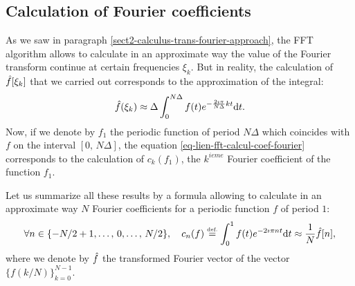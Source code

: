 \subsection{Calculation of Fourier coefficients}
\label{sect2-calcul-coef-fourier} 
 
 
 As we saw in paragraph \ref{sect2-calculus-trans-fourier-approach}, the FFT algorithm allows to calculate in an approximate way the value of the Fourier transform continue at certain frequencies $ \xi_k $. But in reality, the calculation of $ \hat{f}[\xi_k] $ that we carried out corresponds to the approximation of the integral:
\begin{equation}
\label{eq-lien-fft-calcul-coef-fourier}
\hat{f} (\xi_k) \approx \Delta \int_{0}^{N \Delta}{f(t) e^{- \frac{2 \imath \pi}{N \Delta} kt} \mathrm{d} t}.
\end{equation}
Now, if we denote by $ f_1 $ the periodic function of period $ N \Delta $ which coincides with $ f $ on the interval $ [0, \, N \Delta] $, the equation \eqref{eq-lien-fft-calcul-coef-fourier} corresponds to the calculation of $ c_k (f_1) $, the $ k^{ieme} $ Fourier coefficient of the function $ f_1 $.
 
 
Let us summarize all these results by a formula allowing to calculate in an approximate way $ N $ Fourier coefficients for a periodic function $ f $ of period $ 1 $:
\begin{equation*}
\forall n \in \{-N / 2 + 1, \ldots, \, 0, \ldots, \, N / 2 \}, \quad c_n (f) \stackrel{\mbox{\upshape\tiny def.}}{=} \int_0^1{f(t) e^{- 2 \imath \pi nt} \mathrm{d} t} \approx \frac{1}{N} \hat{f}[n],
\end{equation*}
where we denote by $ \hat{f} $ the transformed Fourier vector of the vector $ \{f(k / N) \}_{k = 0}^{N-1} $.
 
